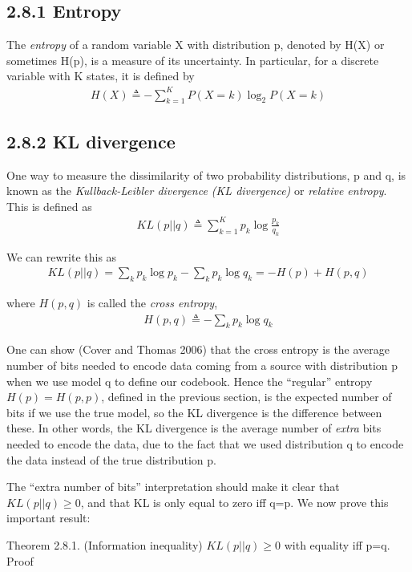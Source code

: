 \documentclass{amsart}
\begin{document}
\subsection{2.8.1 Entropy}
The \emph{entropy} of a random variable X with distribution p, denoted by H(X) or
sometimes H(p), is a measure of its uncertainty. In particular, for a discrete variable
with K states, it is defined by
\begin{align*}
	H(X) \triangleq - \sum_{k=1}^K P(X=k) \log_2{P(X=k)}
\end{align*}

\subsection{2.8.2 KL divergence}
One way to measure the dissimilarity of two probability distributions, p and q, is
known as the \emph{Kullback-Leibler divergence (KL divergence)} or \emph{relative 
entropy}. This is defined as
\begin{align*}
	KL(p||q) \triangleq \sum_{k=1}^K p_k \log{\frac{p_k}{q_k}}
\end{align*}

We can rewrite this as
\begin{align*}
	KL(p||q) = \sum_k p_k \log p_k - \sum_k p_k \log q_k = -H(p) + H(p, q)
\end{align*}

where $H(p, q)$ is called the \emph{cross entropy},
\begin{align*}
	H(p, q) \triangleq -\sum_k p_k \log{q_k}
\end{align*}

One can show (Cover and Thomas 2006) that the cross entropy is the average number of
bits needed to encode data coming from a source with distribution p when we use model
q to define our codebook. Hence the ``regular'' entropy $H(p) = H(p, p)$, defined in
the previous section, is the expected number of bits if we use the true model, so the KL 
divergence is the difference between these. In other words, the KL divergence is the
average number of \emph{extra} bits needed to encode the data, due to the fact that we
used distribution q to encode the data instead of the true distribution p.

The ``extra number of bits'' interpretation should make it clear that $KL(p||q) \geq 0$,
and that KL is only equal to zero iff q=p. We now prove this important result:

Theorem 2.8.1. (Information inequality) $KL(p||q) \geq 0$ with equality iff p=q.
Proof
\end{document}

